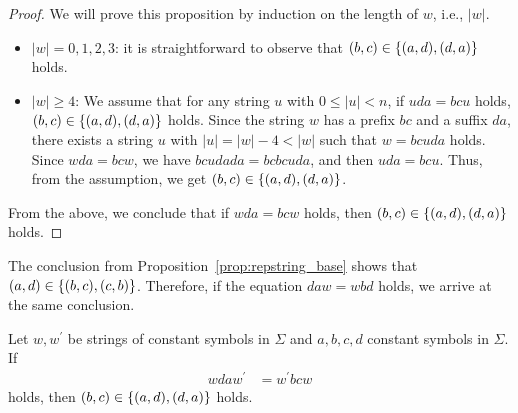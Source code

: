 \begin{proof}
  We will prove this proposition by induction on the length of $w$, i.e., $|w|$.
  \begin{itemize}
  \item $|w| = 0,1,2,3$: it is straightforward to observe that $(b,c) \in \{(a,d), (d,a)\}$ holds.
  \item $|w| \ge 4$: We assume that for any string $u$ with $0\leq |u| < n$, if $uda = bcu$ holds, $(b,c) \in \{(a,d), (d,a)\}$ holds. Since the string $w$ has a prefix $bc$ and a suffix $da$, there exists a string $u$ with $|u| = |w| - 4 < |w|$ such that $w = bcuda$ holds. Since $wda = bcw$, we have $bcudada = bcbcuda$, and then $uda = bcu$. Thus, from the assumption, we get $(b,c) \in \{(a,d), (d,a)\}$.
  \end{itemize}
From the above, we conclude that if $wda = bcw$ holds, then $(b,c) \in \{(a,d), (d,a)\}$ holds.
\end{proof}

The conclusion from Proposition~\ref{prop:repstring_base} shows that $(a,d) \in \{(b,c), (c,b)\}$. Therefore, if the equation $daw = wbd$ holds, we arrive at the same conclusion.

\begin{prop}\label{prop:repstring}
Let $w,w^{\prime}$ be strings of constant symbols in $\Sigma$ and $a,b,c,d$ constant symbols in $\Sigma$.
If
\begin{align}
  wdaw^{\prime} & = w^{\prime}bcw\label{eq:repstring}
\end{align}
holds, then $(b,c) \in \{(a,d), (d,a)\}$ holds.\label{prop:repstring_eq}
\end{prop}

